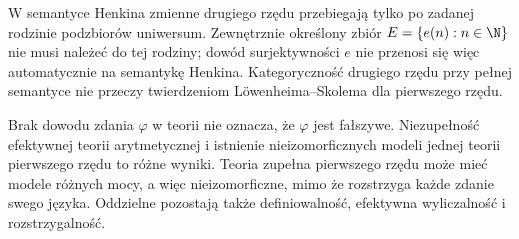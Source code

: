 \begin{uwaga}
\label{rem:ls-second-order-scope}
W semantyce Henkina zmienne drugiego
rzędu przebiegają tylko po zadanej
rodzinie podzbiorów uniwersum.
Zewnętrznie określony zbiór
$E=\{e(n):n\in\N\}$ nie musi
należeć do tej rodziny;
dowód surjektywności $e$
nie przenosi się więc automatycznie
na semantykę Henkina. Kategoryczność
drugiego rzędu przy pełnej semantyce
nie przeczy twierdzeniom
Löwenheima--Skolema dla pierwszego rzędu.
\end{uwaga}

\begin{uwaga}
\label{rem:ls-incompleteness-distinction}
Brak dowodu zdania $\varphi$ w teorii
nie oznacza, że $\varphi$ jest fałszywe.
Niezupełność efektywnej teorii arytmetycznej
i istnienie nieizomorficznych modeli
jednej teorii pierwszego rzędu to różne wyniki.
Teoria zupełna pierwszego rzędu może mieć
modele różnych mocy, a więc nieizomorficzne,
mimo że rozstrzyga każde zdanie swego języka.
Oddzielne pozostają także definiowalność,
efektywna wyliczalność i rozstrzygalność.
\end{uwaga}
